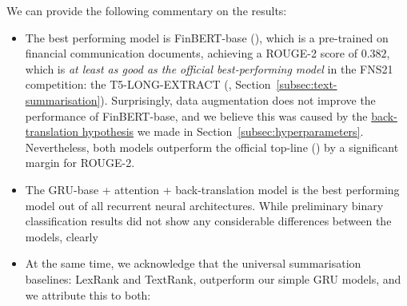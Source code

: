 We can provide the following commentary on the results:
\begin{itemize}
    \item The best performing model is FinBERT-base (\cite{yang2020finbert}), which is a pre-trained on financial communication documents,
        achieving a ROUGE-2 score of $0.382$, which is \emph{at least as good as the official best-performing model} in the FNS21 competition:
        the T5-LONG-EXTRACT (\cite{orzhenovskii-2021-t5}, Section~\ref{subsec:text-summarisation}).
        Surprisingly, data augmentation does not improve the performance of FinBERT-base, and we believe this was caused by
        the \hyperlink{data_augment_hypothesis}{back-translation hypothesis} we made in Section~\ref{subsec:hyperparameters}.
        Nevertheless, both models outperform the official top-line (\cite{litvak-last-2013-multilingual}) by a significant margin for ROUGE-2.
    \item The GRU-base + attention + back-translation model is the best performing model out of all recurrent neural architectures.
    While preliminary binary classification results did not show any considerable differences between the models, clearly
    \item At the same time, we acknowledge that the universal summarisation baselines: LexRank and TextRank, outperform
        our simple GRU models, and we attribute this to both:
\end{itemize}

